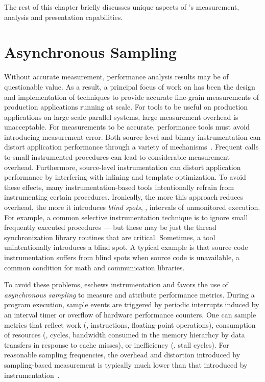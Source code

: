 \documentclass[11pt,letterpaper]{report}
\begin{document}
The rest of this chapter briefly discusses unique aspects of \HPCToolkit{}'s measurement, analysis and presentation capabilities.


\section{Asynchronous Sampling}

Without accurate measurement, performance analysis results may be of questionable value.
As a result, a principal focus of work on \HPCToolkit{} has been the design and implementation of techniques to provide accurate fine-grain measurements of production applications running at scale.
For tools to be useful on production applications on large-scale parallel systems, large measurement overhead is unacceptable.
For measurements to be accurate, performance tools must avoid introducing measurement error.
Both source-level and binary instrumentation can distort application performance through a variety of mechanisms~\cite{Mytkowicz:2009:PWD:2528521.1508275}.
Frequent calls to small instrumented procedures can lead to considerable measurement overhead.
Furthermore, source-level instrumentation can distort application performance by interfering with inlining and template optimization.
To avoid these effects, many instrumentation-based tools intentionally refrain from instrumenting certain procedures.
Ironically, the more this approach reduces overhead, the more it introduces \emph{blind spots}, \ie{}, intervals of unmonitored execution.
For example, a common selective instrumentation technique is to ignore small frequently executed procedures --- but these may be just the thread synchronization library routines that are critical.
Sometimes, a tool unintentionally introduces a blind spot.
A typical example is that source code instrumentation suffers from blind spots when source code is unavailable, a common condition for math and communication libraries.

To avoid these problems, \HPCToolkit{} eschews instrumentation and favors the use of \emph{asynchronous sampling} to measure and attribute performance metrics.
During a program execution, sample events are triggered by periodic interrupts induced by an interval timer or overflow of hardware performance counters.
One can sample metrics that reflect work (\eg{}, instructions, floating-point operations), consumption of resources (\eg{}, cycles, bandwidth consumed in the memory hierarhcy by data transfers in response to cache misses), or inefficiency (\eg{}, stall cycles).
For reasonable sampling frequencies, the overhead and distortion introduced by sampling-based measurement is typically much lower than that introduced by instrumentation~\cite{Froyd-MC-Fo:2005:ICS-csprof}.
\end{document}

